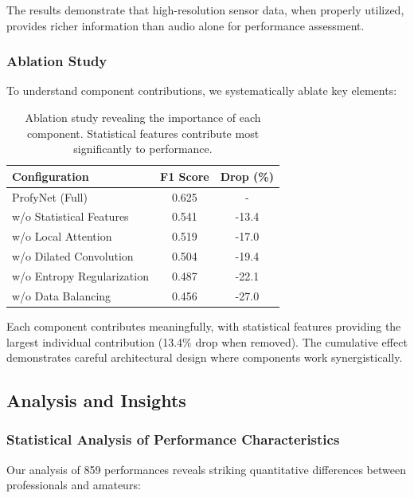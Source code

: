 The results demonstrate that high-resolution sensor data, when properly utilized, provides richer information than audio alone for performance assessment.

\subsubsection{Ablation Study}

To understand component contributions, we systematically ablate key elements:

\begin{table}[h]
\centering
\caption{Ablation study revealing the importance of each component. Statistical features contribute most significantly to performance.}
\label{tab:ablation}
\begin{tabular}{lcc}
\toprule
\textbf{Configuration} & \textbf{F1 Score} & \textbf{Drop (\%)} \\
\midrule
ProfyNet (Full) & 0.625 & - \\
\quad w/o Statistical Features & 0.541 & -13.4 \\
\quad w/o Local Attention & 0.519 & -17.0 \\
\quad w/o Dilated Convolution & 0.504 & -19.4 \\
\quad w/o Entropy Regularization & 0.487 & -22.1 \\
\quad w/o Data Balancing & 0.456 & -27.0 \\
\bottomrule
\end{tabular}
\end{table}

Each component contributes meaningfully, with statistical features providing the largest individual contribution (13.4\% drop when removed). The cumulative effect demonstrates careful architectural design where components work synergistically.

\subsection{Analysis and Insights}

\subsubsection{Statistical Analysis of Performance Characteristics}

Our analysis of 859 performances reveals striking quantitative differences between professionals and amateurs:

